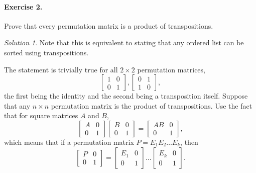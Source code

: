 \documentclass[11pt]{report}
\theoremstyle{remark}
\newtheorem*{solution}{Solution}
\begin{document}
    \paragraph{Exercise 2.} Prove that every permutation matrix is a product of
    transpositions.
    \begin{solution}
        Note that this is equivalent to stating that any ordered list can be sorted
        using transpositions.

        The statement is trivially true for all $2\times 2$ permutation matrices, \[
            \begin{bmatrix}
                1 & 0 \\ 0 & 1
            \end{bmatrix},
            \begin{bmatrix}
                0 & 1 \\ 1 & 0
            \end{bmatrix},
        \] the first being the identity and the second being a transposition itself.
        Suppose that any $n\times n$ permutation matrix is the product of
        transpositions. Use the fact that for square matrices $A$ and $B$, \[
            \begin{bmatrix}
                A & 0 \\
                0 & 1
            \end{bmatrix}
            \begin{bmatrix}
                B & 0 \\
                0 & 1
            \end{bmatrix}
            = \begin{bmatrix}
                AB & 0 \\
                0  & 1
            \end{bmatrix},
        \] which means that if a permutation matrix $P = E_1E_2 \dots E_k$, then \[
            \begin{bmatrix}
                P & 0 \\
                0 & 1
            \end{bmatrix} =
            \begin{bmatrix}
                E_1 & 0 \\
                0   & 1
            \end{bmatrix}
            \dots
            \begin{bmatrix}
                E_k & 0 \\
                0   & 1
            \end{bmatrix}.
\]
\end{solution}
\end{document}
